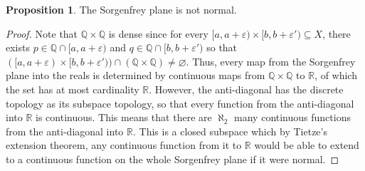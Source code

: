 \documentclass[12pt,reqno]{amsart}
\numberwithin{theorem}{section}
\theoremstyle{definition}
\theoremstyle{remark}
\numberwithin{equation}{section}
\theoremstyle{definition}
\newtheorem{prop}[theorem]{Proposition}
\newcommand{\R}{\mathbb{R}}
\begin{document}
\begin{prop}
    The Sorgenfrey plane is not normal.
\end{prop}
\begin{proof}
    Note that $\mathbb Q \times \mathbb Q$ is dense since for every $[a,a+\varepsilon)\times [b,b+\varepsilon') \subseteq X$, there exists $p \in \mathbb Q \cap [a,a+\varepsilon)$ and $q \in \mathbb Q \cap [b,b+\varepsilon') $ so that $([a,a+\varepsilon)\times [b,b+\varepsilon'))\cap (\mathbb Q \times \mathbb Q) \neq \varnothing$. Thus, every map from the Sorgenfrey plane into the reals is determined by continuous maps from $\mathbb Q \times \mathbb Q$ to $\R$, of which the set has at most cardinality $\R$. However, the anti-diagonal has the discrete topology as its subspace topology, so that every function from the anti-diagonal into $\R$ is continuous. This means that there are $\aleph_2$ many continuous functions from the anti-diagonal into $\R$. This is a closed subspace which by Tietze's extension theorem, any continuous function from it to $\R$ would be able to extend to a continuous function on the whole Sorgenfrey plane if it were normal. 
\end{proof}
\end{document}

